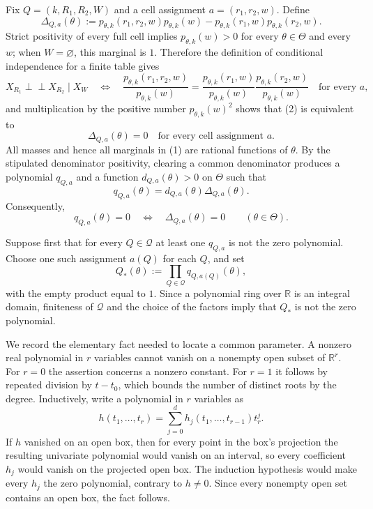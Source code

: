 Fix \(Q=(k,R_1,R_2,W)\) and a cell assignment \(a=(r_1,r_2,w)\). Define
\[
 \Delta_{Q,a}(\theta)
 :=p_{\theta,k}(r_1,r_2,w)p_{\theta,k}(w)
   -p_{\theta,k}(r_1,w)p_{\theta,k}(r_2,w).
 \tag{1}
\]
Strict positivity of every full cell implies \(p_{\theta,k}(w)>0\) for every \(\theta\in\Theta\) and every \(w\); when \(W=\varnothing\), this marginal is \(1\). Therefore the definition of conditional independence for a finite table gives
\[
 X_{R_1}\mathbin{\perp\!\!\!\perp}X_{R_2}\mid X_W
 \quad\Longleftrightarrow\quad
 \frac{p_{\theta,k}(r_1,r_2,w)}{p_{\theta,k}(w)}
 =
 \frac{p_{\theta,k}(r_1,w)}{p_{\theta,k}(w)}
 \frac{p_{\theta,k}(r_2,w)}{p_{\theta,k}(w)}
 \quad\text{for every }a,
 \tag{2}
\]
and multiplication by the positive number \(p_{\theta,k}(w)^2\) shows that (2) is equivalent to
\[
 \Delta_{Q,a}(\theta)=0
 \quad\text{for every cell assignment }a.
 \tag{3}
\]
All masses and hence all marginals in (1) are rational functions of \(\theta\). By the stipulated denominator positivity, clearing a common denominator produces a polynomial \(q_{Q,a}\) and a function \(d_{Q,a}(\theta)>0\) on \(\Theta\) such that
\[
 q_{Q,a}(\theta)=d_{Q,a}(\theta)\Delta_{Q,a}(\theta).
 \tag{4}
\]
Consequently,
\[
 q_{Q,a}(\theta)=0
 \quad\Longleftrightarrow\quad
 \Delta_{Q,a}(\theta)=0
 \qquad(\theta\in\Theta).
 \tag{5}
\]

Suppose first that for every \(Q\in\mathcal Q\) at least one \(q_{Q,a}\) is not the zero polynomial. Choose one such assignment \(a(Q)\) for each \(Q\), and set
\[
 Q_*(\theta):=\prod_{Q\in\mathcal Q}q_{Q,a(Q)}(\theta),
 \tag{6}
\]
with the empty product equal to \(1\). Since a polynomial ring over \(\mathbb R\) is an integral domain, finiteness of \(\mathcal Q\) and the choice of the factors imply that \(Q_*\) is not the zero polynomial.

We record the elementary fact needed to locate a common parameter. A nonzero real polynomial in \(r\) variables cannot vanish on a nonempty open subset of \(\mathbb R^r\). For \(r=0\) the assertion concerns a nonzero constant. For \(r=1\) it follows by repeated division by \(t-t_0\), which bounds the number of distinct roots by the degree. Inductively, write a polynomial in \(r\) variables as
\[
 h(t_1,\ldots,t_r)=\sum_{j=0}^{d}h_j(t_1,\ldots,t_{r-1})t_r^j.
 \tag{7}
\]
If \(h\) vanished on an open box, then for every point in the box's projection the resulting univariate polynomial would vanish on an interval, so every coefficient \(h_j\) would vanish on the projected open box. The induction hypothesis would make every \(h_j\) the zero polynomial, contrary to \(h\ne0\). Since every nonempty open set contains an open box, the fact follows.

